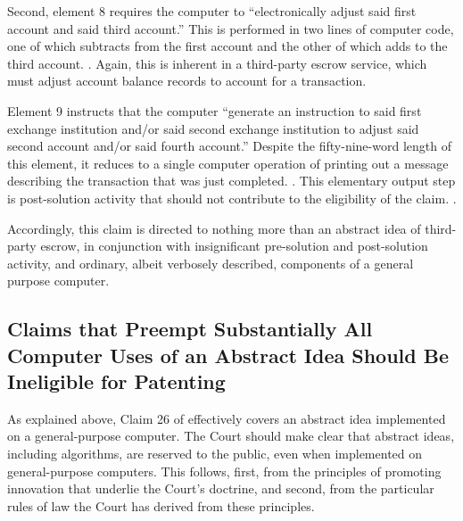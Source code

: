 \documentclass{scotus}
\begin{document}
Second, element 8 requires the computer to ``electronically adjust said first
account and said third account.'' This is performed in two lines of computer
code, one of which subtracts from the first account and the other of which adds
to the third account. . Again, this
is inherent in a third-party escrow service, which must adjust account balance
records to account for a transaction.

Element 9 instructs that the computer ``generate an instruction to said first
exchange institution and/or said second exchange institution to adjust said
second account and/or said fourth account.'' Despite the fifty-nine-word length
of this element, it reduces to a single computer operation of printing out a
message describing the transaction that was just completed. . This elementary output step is post-solution activity
that should not contribute to the eligibility of the claim. .

Accordingly, this claim is directed to nothing more than an abstract idea of
third-party escrow, in conjunction with insignificant pre-solution and
post-solution activity, and ordinary, albeit verbosely described, components of
a general purpose computer.

\subsection{Claims that Preempt Substantially All Computer Uses of an Abstract
Idea Should Be Ineligible for Patenting}

\iffalse
A patent claim with the ``practical effect'' of removing an abstract idea from
the public domain is ineligible under \inline{101}. \sentence{see benson at
71-72}.
Claim 26 of the '375 patent would have the practical effect of removing all uses
of an abstract idea \emph{implemented on a general-purpose computer} from the
public domain.
\fi

As explained above, Claim 26 of  effectively covers an abstract
idea implemented on a general-purpose computer.
The Court should make clear that abstract ideas, including
algorithms, are reserved to the public, even when implemented on general-purpose
computers.
This follows, first, from the principles of promoting innovation that underlie
the Court's  doctrine, and second, from the particular rules of law
the Court has derived from these principles.
\end{document}
